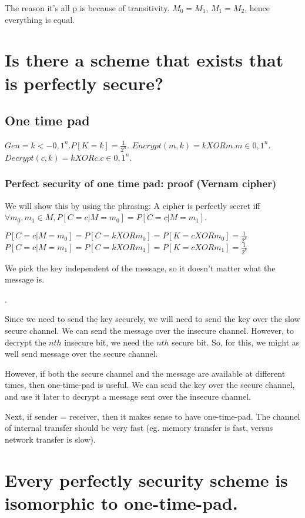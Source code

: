 The reason it's all p is because of transitivity. $M_0 = M_1$, $M_1 = M_2$, hence everything is equal.

\section{Is there a scheme that exists that is perfectly secure?}

\subsection{One time pad}
$Gen = k <- {0, 1}^n. P[K=k] = \frac{1}{2^n}$.
$Encrypt(m, k) = k XOR m. m \in {0, 1}^n$.
$Decrypt(c, k) = k XOR c. c \in {0, 1}^n$.

\subsubsection{Perfect security of one time pad: proof (Vernam cipher)}
We will show this by using the phrasing:
A cipher is perfectly secret iff $\forall m_0, m_1 \in M, P[C=c|M=m_0] = P[C=c|M=m_1]$.

$P[C=c|M=m_0] = P[C=k XOR m_0] = P[K=c XOR m_0] = \frac{1}{2^k}$
$P[C=c|M=m_1] = P[C=k XOR m_1] = P[K=c XOR m_1] = \frac{1}{2^k}$

We pick the key independent of the message, so it doesn't matter what the message is.

.

Since we need to send the key securely, we will need to send the key over the slow secure channel. We can
send the message over the insecure channel. However, to decrypt the $nth$ insecure bit, we need the $nth$
secure bit. So, for this, we might as well send message over the secure channel.


However, if both the secure channel and the message are available at different times, then one-time-pad is useful.
We can send the key over the secure channel, and use it later to decrypt a message sent over the insecure channel.


Next, if sender = receiver, then it makes sense to have one-time-pad. The channel of internal transfer should be
very fast (eg. memory transfer is fast, versus network transfer is slow).

\section{Every perfectly security scheme is isomorphic to one-time-pad.}
